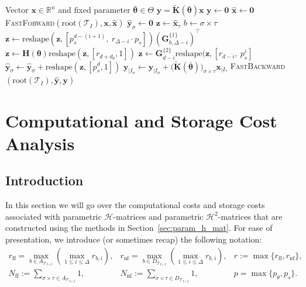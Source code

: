 \documentclass[final,3p,times]{elsarticle}
\newcommand{\mc}[1]{\mathcal{#1}}
\renewcommand{\vec}[1]{\boldsymbol{#1}}
\newcommand{\vech}[1]{\widehat{\boldsymbol{#1}}}
\newcommand{\mat}[1]{\boldsymbol{#1}}
\newcommand{\R}{\mathbb{R}}
\newcommand{\mathat}[1]{\widetilde{\boldsymbol{#1}}}
\begin{document}
\begin{algorithm}[!ht]
\caption{Modified $\mc{H}^{2}$-Matrix MVM}
\label{alg:ttmv}
\begin{algorithmic}[1]
\Require Vector $\vec{x} \in \R^{n}$ and fixed parameter $\bar{\vec{\theta}} \in \Theta$
\Ensure $\vec{y} = \mathat{K}(\bar{\vec{\theta}})\vec{x}$
\State $\vec{y} \gets \vec{0}$
\State $\vech{x} \gets \vec{0}$
\State \textsc{FastForward}$(\mathrm{root}(\mc{T}_{I}), \vec{x}, \hat{\vec{x}})$ 
\For{$\sigma \in \mc{T}_{I}$}
  \State $\vech{y}_{\sigma} \gets \vec{0}$
\EndFor
\ForAll{$\sigma \times \tau \in A_{\mc{T}_{I \times I}}$}
  \State $\vec{z} \gets \vech{x}_{\tau}$
  \State $b \gets \sigma \times \tau$
  \State $\vec{z} \gets \text{reshape}(\vec{z}, [p_s^{d-(i+1)},~ r_{\Delta-i} \cdot p_s ] )(\mat{G}^{\{1\}}_{b, \Delta-i})^{\top} $
  \EndFor
  \State $\vec{z} \gets \mat{H}(\vec{\theta})\text{reshape}(\vec{z}, [r_{d+d_{\theta}}, 1 ])$
  \State $\vec{z} \gets \mat{G}_{d-i}^{\{2\}} \text{reshape}(\vec{z},[r_{d-i},~p_s^{i}  ] $
  \EndFor
  \State $\vech{y}_{\sigma} \gets \vech{y}_{\sigma} + \text{reshape}(\vec{z}, [p_s^d, 1])$
\EndFor
\ForAll{$\sigma \times \tau \in D_{\mc{T}_{I \times I}}$}
  \State $\vec{y}_{|I_\sigma} \gets \vec{y}_{|I_\sigma} +
         \bigl(\mathat{K}(\bar{\vec{\theta}})\bigr)_{\sigma \times \tau}\vec{x}_{|I_\tau}$
\EndFor
\State \textsc{FastBackward}$(\mathrm{root}(\mc{T}_{I}), \hat{\vec{y}}, \vec{y})$
\end{algorithmic}
\end{algorithm}


\section{Computational and Storage Cost Analysis}\label{sec:comp_cost_and_storage}

\subsection{Introduction}\label{ssec:comp_cost_and_storage_intro}
In this section we will go over the computational costs and storage costs associated with  parametric $\mc{H}$-matrices and parametric $\mc{H}^{2}$-matrices that are constructed using the methods in Section~\ref{sec:param_h_mat}. For ease of presentation, we introduce (or sometimes recap) the following notation:
\[
\begin{array}{lll}
r_{\text{ff}} = \max_{b \in A_{\mc{T}_{I \times I}}} (\underset{1 \le i \le \Delta}{\max}r_{b,i}), & 
r_{\text{nf}} = \max_{b \in D_{\mc{T}_{I \times I}}} (\underset{1 \le i \le \Delta}{\max}r_{b,i}), & 
r := \max\{r_{\text{ff}}, r_{\text{nf}}\}, \\[4pt]
N_{\text{ff}} := \sum_{\sigma \times \tau \in A_{\mc{T}_{I \times I}}} 1, & 
N_{\text{nf}} := \sum_{\sigma \times \tau \in D_{\mc{T}_{I \times I}}} 1, &  p = \max\{p_{\theta}, p_{s}\}.\\[4pt]
\end{array}
\]
\end{document}

